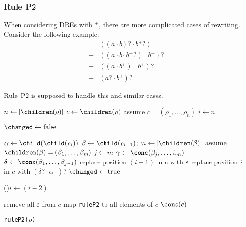 \documentclass[a4paper,11pt, svgnames,titlepage]{article}
\newcommand{\rxp}{{^\mathtt{+}}}
\newcommand{\rxo}{\mathtt{?}}
\newcommand{\rxc}{\cdot}
\DeclareMathOperator{\ror}{\mathtt{|}}
\newcommand{\emptyword}{\varepsilon}
\newcommand{\true}{\ensuremath{\operatorname{true}}\xspace}
\newcommand{\false}{\ensuremath{\operatorname{false}}\xspace}
\begin{document}
\subsubsection{Rule P2}
When considering DREs with $\rxp$, there are more complicated cases of rewriting. Consider the following example:
\begin{align*}
	&( (a \rxc b)\rxo \rxc b\rxp\rxo)\\
	\equiv& ((a \rxc b \rxc b\rxp\rxo) \ror b\rxp)\rxo\\
	\equiv& ((a \rxc b\rxp) \ror b\rxp)\rxo\\
	\equiv& (a\rxo \rxc b\rxp)\rxo
\end{align*}

Rule~P2 is supposed to handle this and similar cases.

\begin{algorithm2e}[H]
	\SetAlgoLined

	{
		$n\leftarrow |\children(\rho)|$\;
		$c\leftarrow \children(\rho)$\;
		assume $c=(\rho_1,\ldots,\rho_n)$\;
		$i\leftarrow n$\;
		{
			$\changed\leftarrow\false$\;
			{
				$\alpha\leftarrow \child(\child(\rho_{i}))$ \tcp*[r]{Hence, $\rho_{i}=\alpha\rxp\rxo$}
				{
					$\beta\leftarrow \child(\rho_{i-1})$;
					$m\leftarrow |\children(\beta)|$\;
					assume $\children(\beta)=(\beta_{1},\ldots,\beta_{m})$\;
					$j\leftarrow m$\;
					{
						$\gamma\leftarrow\conc(\beta_{j},\ldots,\beta_{m})$\;
						{
							$\delta\leftarrow \conc(\beta_{1},\ldots,\beta_{j-1})$\;
							replace position $(i-1)$ in $c$ with $\emptyword$\;
							replace position $i$ in $c$ with $(\delta\rxo \rxc\alpha\rxp)\rxo$\;
							$\changed\leftarrow\true$\;
						}
					}
				}

			}
			\lIf(){\changed}{$i\leftarrow(i-2)$}
		}
		remove all $\emptyword$ from $c$\;
		map \texttt{ruleP2} to all elements of $c$\;
		\Return $\conc(c)$\;
	}

	\caption{\texttt{ruleP2(}$\rho$\texttt{)}}
\end{algorithm2e}
\end{document}
